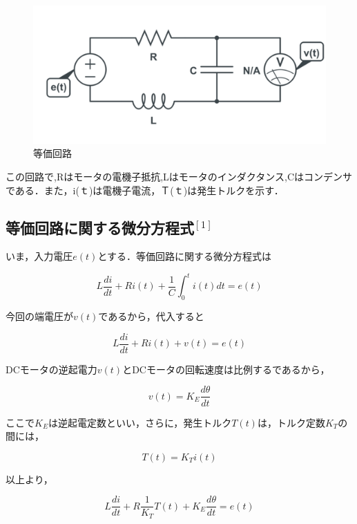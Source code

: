 \documentclass[xelatex,ja=standard,jafont=noto]{bxjsarticle}
\begin{document}
\begin{figure}[h!]
    \centering
    \includegraphics[scale=0.4]{011.png}
    \caption{等価回路 }
\end{figure}

この回路で,Rはモータの電機子抵抗,Lはモータのインダクタンス,Cはコンデンサである．また，i(ｔ)は電機子電流，Ｔ(ｔ)は発生トルクを示す．\\

\subsection{等価回路に関する微分方程式$ ^{[1]}　$}

いま，入力電圧$ e(t) $とする．等価回路に関する微分方程式は

	\begin{equation}
L\frac{di}{dt}+Ri(t)+\frac{1}{C}\int_{0}^{t}i(t)dt=e(t)
	\end{equation}
	
	
	今回の端電圧が$ v(t) $であるから，代入すると
	
	\begin{equation}
L\frac{di}{dt}+Ri(t)+v(t)=e(t)
	\end{equation}
	
	DCモータの逆起電力$ v(t) $とDCモータの回転速度は比例するであるから，
	
		\begin{equation}
v(t)=K_{E}\frac{d\theta}{dt}
	\end{equation}
	
	ここで$ K_{E}　$は逆起電定数といい，さらに，発生トルク$ T(t)　$は，トルク定数$ K_{T}　$の間には，
	
	\begin{equation}
T(t)=K_{T}i(t)
	\end{equation}
	
	以上より，
	
	\begin{equation}
	L\frac{di}{dt}+R\frac{1}{K_{T}}T(t)+K_{E}\frac{d\theta}{dt}=e(t)
	\end{equation}
	
\end{document}
